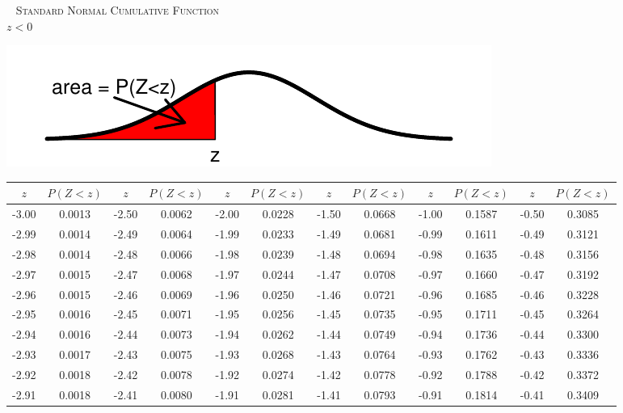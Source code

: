 \documentclass[12pt,letterpaper]{article}
\author{Chad Worley}
\begin{document}
\thispagestyle{empty}


\begin{multicols}{2}
{~}
\vfill
\textsc{Standard Normal Cumulative Function}\\\indent
$z<0$
\vfill
{~}
\columnbreak

\includegraphics[scale=0.9]{zneg.pdf}
\end{multicols}
\vspace{-20pt}

\begin{center} \footnotesize
\renewcommand{\arraystretch}{1.1}
\begin{tabular}{c c | c c | c c | c c | c c | c c}
$z$ & $P(Z<z)$ & $z$ & $P(Z<z)$ & $z$ & $P(Z<z)$ & $z$ & $P(Z<z)$ & $z$ & $P(Z<z)$ & $z$ & $P(Z<z)$\\ \hline
-3.00 & 0.0013 & -2.50 & 0.0062 & -2.00 & 0.0228 & -1.50 & 0.0668 & -1.00 & 0.1587 & -0.50 & 0.3085 \\
-2.99 & 0.0014 & -2.49 & 0.0064 & -1.99 & 0.0233 & -1.49 & 0.0681 & -0.99 & 0.1611 & -0.49 & 0.3121 \\
-2.98 & 0.0014 & -2.48 & 0.0066 & -1.98 & 0.0239 & -1.48 & 0.0694 & -0.98 & 0.1635 & -0.48 & 0.3156 \\
-2.97 & 0.0015 & -2.47 & 0.0068 & -1.97 & 0.0244 & -1.47 & 0.0708 & -0.97 & 0.1660 & -0.47 & 0.3192 \\
-2.96 & 0.0015 & -2.46 & 0.0069 & -1.96 & 0.0250 & -1.46 & 0.0721 & -0.96 & 0.1685 & -0.46 & 0.3228 \\
-2.95 & 0.0016 & -2.45 & 0.0071 & -1.95 & 0.0256 & -1.45 & 0.0735 & -0.95 & 0.1711 & -0.45 & 0.3264 \\
-2.94 & 0.0016 & -2.44 & 0.0073 & -1.94 & 0.0262 & -1.44 & 0.0749 & -0.94 & 0.1736 & -0.44 & 0.3300 \\
-2.93 & 0.0017 & -2.43 & 0.0075 & -1.93 & 0.0268 & -1.43 & 0.0764 & -0.93 & 0.1762 & -0.43 & 0.3336 \\
-2.92 & 0.0018 & -2.42 & 0.0078 & -1.92 & 0.0274 & -1.42 & 0.0778 & -0.92 & 0.1788 & -0.42 & 0.3372 \\
-2.91 & 0.0018 & -2.41 & 0.0080 & -1.91 & 0.0281 & -1.41 & 0.0793 & -0.91 & 0.1814 & -0.41 & 0.3409 \\

\end{tabular}
\end{center}
\end{document}
